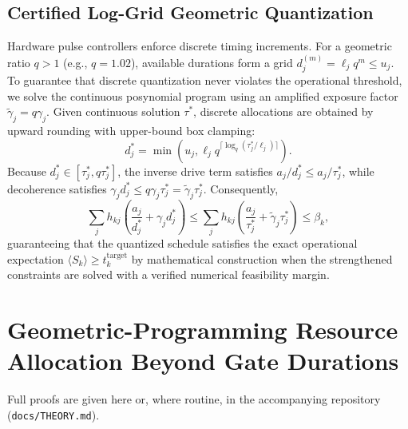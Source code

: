 \documentclass[10pt,letterpaper,journal]{IEEEtran}
\begin{document}
\subsection{Certified Log-Grid Geometric Quantization}
Hardware pulse controllers enforce discrete timing increments. For a geometric ratio $q > 1$ (e.g., $q = 1.02$), available durations form a grid $d_j^{(m)} = \ell_j q^m \le u_j$. To guarantee that discrete quantization never violates the operational threshold, we solve the continuous posynomial program using an amplified exposure factor $\tilde{\gamma}_j = q \gamma_j$. Given continuous solution $\tau^*$, discrete allocations are obtained by upward rounding with upper-bound box clamping:
\begin{equation}
d_j^* = \min\left(u_j, \ell_j q^{\lceil \log_q (\tau_j^* / \ell_j) \rceil}\right).
\end{equation}
Because $d_j^* \in [\tau_j^*, q \tau_j^*]$, the inverse drive term satisfies $a_j / d_j^* \le a_j / \tau_j^*$, while decoherence satisfies $\gamma_j d_j^* \le q \gamma_j \tau_j^* = \tilde{\gamma}_j \tau_j^*$. Consequently,
\begin{equation}
\sum_j h_{kj} \left( \frac{a_j}{d_j^*} + \gamma_j d_j^* \right) \le \sum_j h_{kj} \left( \frac{a_j}{\tau_j^*} + \tilde{\gamma}_j \tau_j^* \right) \le \beta_k,
\end{equation}
guaranteeing that the quantized schedule satisfies the exact operational expectation $\langle S_k \rangle \ge t_k^{\mathrm{target}}$ by mathematical construction when the strengthened constraints are solved with a verified numerical feasibility margin.



\section{Geometric-Programming Resource Allocation Beyond Gate Durations}\label{sec:framework}
Full proofs are given here or, where routine, in the accompanying repository (\texttt{docs/THEORY.md}).
\end{document}
